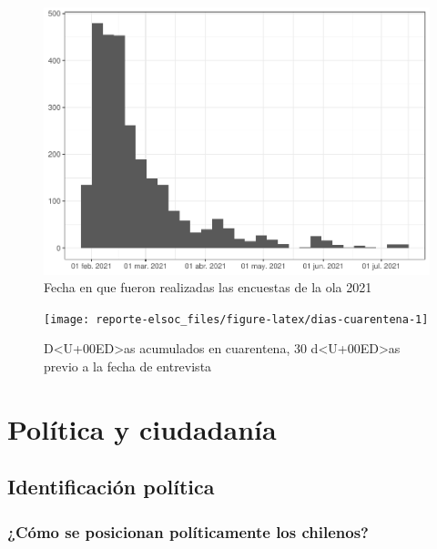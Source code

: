 \documentclass[
  12pt,
]{book}
\begin{document}
\begin{figure}

{\centering \includegraphics{reporte-elsoc_files/figure-latex/hist-fecha-2021-1} 

}

\caption{Fecha en que fueron realizadas las encuestas de la ola 2021}\label{fig:hist-fecha-2021}
\end{figure}

\begin{figure}

{\centering \texttt{[image: reporte-elsoc\_files/figure-latex/dias-cuarentena-1]} 

}

\caption{D<U+00ED>as acumulados en cuarentena, 30 d<U+00ED>as previo a la fecha de entrevista}\label{fig:dias-cuarentena}
\end{figure}

\hypertarget{poluxedtica-y-ciudadanuxeda}{%
\chapter{Política y ciudadanía}\label{poluxedtica-y-ciudadanuxeda}}

\hypertarget{identificaciuxf3n-poluxedtica}{%
\section{Identificación política}\label{identificaciuxf3n-poluxedtica}}

\hypertarget{cuxf3mo-se-posicionan-poluxedticamente-los-chilenos}{%
\subsection*{¿Cómo se posicionan políticamente los chilenos?}\label{cuxf3mo-se-posicionan-poluxedticamente-los-chilenos}}
\end{document}
